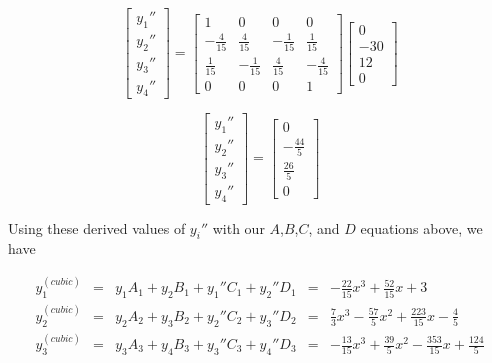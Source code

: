 \documentclass[11pt]{article} %
\begin{document}
$$
\begin{bmatrix} y_1'' \\ y_2'' \\ y_3'' \\ y_4'' \end{bmatrix} = 
\begin{bmatrix} 1 & 0 & 0 & 0 \\ -\frac{4}{15} & \frac{4}{15} & -\frac{1}{15} & \frac{1}{15} 
		 \\  \frac{1}{15} & -\frac{1}{15} & \frac{4}{15} & -\frac{4}{15} \\ 0 & 0 &0 & 1
\end{bmatrix}
\begin{bmatrix} 0 \\ -30 \\ 12 \\ 0\end{bmatrix}$$

$$
\begin{bmatrix} y_1'' \\ y_2'' \\ y_3'' \\ y_4'' \end{bmatrix} = 
\begin{bmatrix} 0 \\ -\frac{44}{5} \\\frac{26}{5} \\ 0\end{bmatrix}$$

Using these derived values of $y_i''$ with our $A$,$B$,$C$, and $D$ equations above, we have

$$\begin{array}{lclcl} y^{(cubic)}_1 & = &  y_1A_1 + y_2B_1 + y_1''C_1 + y_2'' D_1 & = 
							& -\frac{22}{15}x^3 + \frac{52}{15}x + 3\\
		        y^{(cubic)}_2  & = & y_2A_2 + y_3B_2 + y_2''C_2 + y_3'' D_2 & = 
							&  \frac{7}{3}x^3 - \frac{57}{5}x^2 + \frac{223}{15}x - \frac{4}{5}\\
		        y^{(cubic)}_3  & = & y_3A_3 + y_4B_3 + y_3''C_3 + y_4'' D_3 & =
							& -\frac{13}{15}x^3 + \frac{39}{5}x^2 - \frac{353}{15}x + \frac{124}{5}
\end{array}$$
\end{document}
